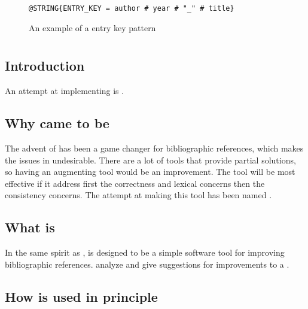 
\begin{figure}
  \centering
\begin{verbatim}
@STRING{ENTRY_KEY = author # year # "_" # title}
\end{verbatim}
  \caption{An example of a entry key pattern}
  \label{fig:analyzing_entry_key_pattern}
\end{figure}



\section{{\orangutan}}

\subsection{Introduction}

An attempt at implementing is {\orangutan}.


\subsection{Why {\orangutan} came to be}

The advent of {\bibtex} has been a game changer for bibliographic
references, which makes the issues in {\bibtex} undesirable.  There
are a lot of tools that provide partial solutions, so having an
augmenting tool would be an improvement.  The tool will be most
effective if it address first the correctness and lexical concerns
then the consistency concerns.  The attempt at making this tool has
been named \newdef{\orangutan}.


\subsection{What is {\orangutan}}

In the same spirit as {\bibtex}, {\orangutan} is designed to be a
simple software tool for improving bibliographic references.
{\orangutan} analyze and give suggestions for improvements to a
.


\subsection{How {\orangutan} is used in principle}

